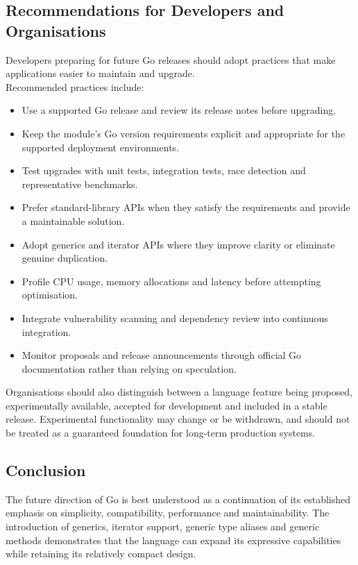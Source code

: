 \subsection{Recommendations for Developers and Organisations}

Developers preparing for future Go releases should adopt practices that make applications easier to maintain and upgrade.\\

Recommended practices include:

\begin{itemize}
    \item Use a supported Go release and review its release notes before upgrading.
    \item Keep the module's Go version requirements explicit and appropriate for the supported deployment environments.
    \item Test upgrades with unit tests, integration tests, race detection and representative benchmarks.
    \item Prefer standard-library APIs when they satisfy the requirements and provide a maintainable solution.
    \item Adopt generics and iterator APIs where they improve clarity or eliminate genuine duplication.
    \item Profile CPU usage, memory allocations and latency before attempting optimisation.
    \item Integrate vulnerability scanning and dependency review into continuous integration.
    \item Monitor proposals and release announcements through official Go documentation rather than relying on speculation.
\end{itemize}

Organisations should also distinguish between a language feature being proposed, experimentally available, accepted for development and included in a stable release. Experimental functionality may change or be withdrawn, and should not be treated as a guaranteed foundation for long-term production systems.

\subsection{Conclusion}

The future direction of Go is best understood as a continuation of its established emphasis on simplicity, compatibility, performance and maintainability. The introduction of generics, iterator support, generic type aliases and generic methods demonstrates that the language can expand its expressive capabilities while retaining its relatively compact design.\\

